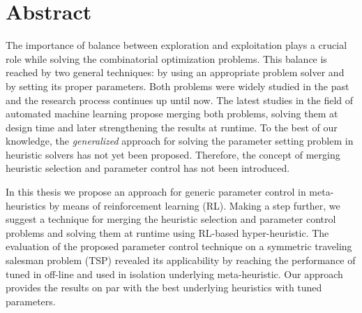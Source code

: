 \newpage
\section*{Abstract}
The importance of balance between exploration and exploitation plays a crucial role while solving the combinatorial optimization problems. This balance is reached by two general techniques: by using an appropriate problem solver and by setting its proper parameters. Both problems were widely studied in the past and the research process continues up until now. The latest studies in the field of automated machine learning propose merging both problems, solving them at design time and later strengthening the results at runtime. To the best of our knowledge, the \emph{generalized} approach for solving the parameter setting problem in heuristic solvers has not yet been proposed. Therefore, the concept of merging heuristic selection and parameter control has not been introduced.

In this thesis we propose an approach for generic parameter control in meta-heuristics by means of reinforcement learning (RL). Making a step further, we suggest a technique for merging the heuristic selection and parameter control problems and solving them at runtime using RL-based hyper-heuristic. The evaluation of the proposed parameter control technique on a symmetric traveling salesman problem (TSP) revealed its applicability by reaching the performance of tuned in off-line and used in isolation underlying meta-heuristic. Our approach provides the results on par with the best underlying heuristics with tuned parameters.